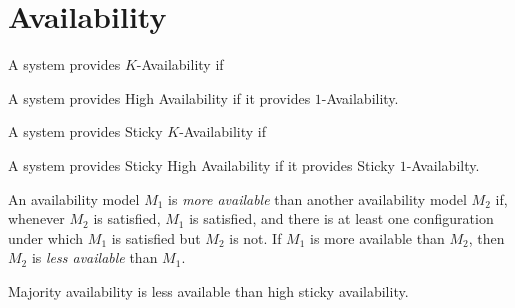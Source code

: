 
\section{Availability}

\begin{definition}[$K$-Availability]
A system provides $K$-Availability if
\end{definition}

\begin{definition}
A system provides High Availability if it provides $1$-Availability.
\end{definition}

\begin{definition}
A system provides Sticky $K$-Availability if 
\end{definition}

\begin{definition}
A system provides Sticky High Availability if it provides Sticky
$1$-Availabilty.
\end{definition}

\begin{definition}
An availability model $M_1$ is \textit{more available} than another
availability model $M_2$ if, whenever $M_2$ is satisfied, $M_1$ is
satisfied, and there is at least one configuration under which $M_1$
is satisfied but $M_2$ is not. If $M_1$ is more available than $M_2$,
then $M_2$ is \textit{less available} than $M_1$.
\end{definition}

\begin{observation}
Majority availability is less available than high sticky availability.
\end{observation}

